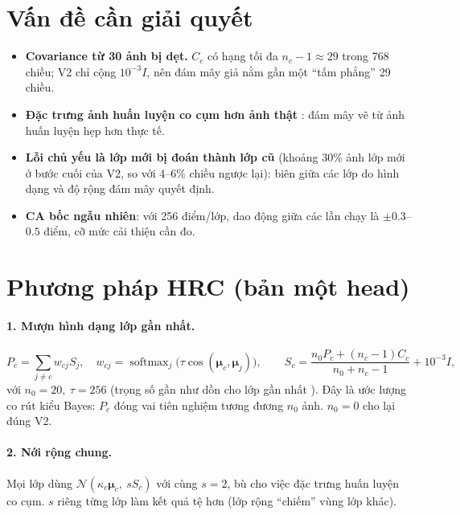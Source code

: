 \documentclass[11pt]{article}
\newcommand{\bmu}{\boldsymbol{\mu}}
\begin{document}
\section{Vấn đề cần giải quyết}
\begin{itemize}
\item \textbf{Covariance từ 30 ảnh bị dẹt.} $C_c$ có hạng tối đa $n_c-1\approx29$ trong 768 chiều; V2 chỉ cộng
      $10^{-3}I$, nên đám mây giả nằm gần một ``tấm phẳng'' 29 chiều.
\item \textbf{Đặc trưng ảnh huấn luyện co cụm hơn ảnh thật} \cite{nc,efron}: đám mây vẽ từ ảnh huấn luyện hẹp hơn
      thực tế.
\item \textbf{Lỗi chủ yếu là lớp mới bị đoán thành lớp cũ} (khoảng 30\% ảnh lớp mới ở bước cuối của V2, so với
      4--6\% chiều ngược lại): biên giữa các lớp do hình dạng và độ rộng đám mây quyết định.
\item \textbf{CA bốc ngẫu nhiên}: với 256 điểm/lớp, dao động giữa các lần chạy là $\pm0.3$--$0.5$ điểm, cỡ mức cải
      thiện cần đo.
\end{itemize}

\section{Phương pháp HRC (bản một head)}
\paragraph{1. Mượn hình dạng lớp gần nhất.}
\begin{equation}
P_c=\sum_{j\ne c}w_{cj}S_j,\quad w_{cj}=\operatorname{softmax}_j\big(\tau\cos(\bmu_c,\bmu_j)\big),\qquad
S_c=\frac{n_0P_c+(n_c-1)C_c}{n_0+n_c-1}+10^{-3}I,
\end{equation}
với $n_0=20,\ \tau=256$ (trọng số gần như dồn cho lớp gần nhất \cite{freelunch}). Đây là ước lượng co rút kiểu Bayes:
$P_c$ đóng vai tiên nghiệm tương đương $n_0$ ảnh. $n_0=0$ cho lại đúng V2.

\paragraph{2. Nới rộng chung.} Mọi lớp dùng $\mathcal{N}(\kappa_c\bmu_c,\ sS_c)$ với cùng $s=2$, bù cho việc đặc trưng
huấn luyện co cụm. $s$ riêng từng lớp làm kết quả tệ hơn (lớp rộng ``chiếm'' vùng lớp khác).
\end{document}
